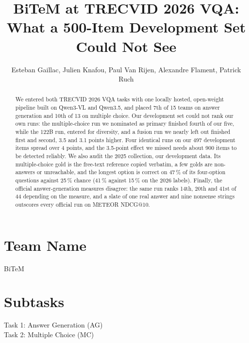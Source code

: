 \documentclass[sigconf,nonacm]{acmart}
\begin{document}
\title{BiTeM at TRECVID 2026 VQA: What a 500-Item Development Set Could Not See}

\author{Esteban Gaillac, Julien Knafou, Paul Van Rijen, Alexandre Flament, Patrick Ruch}

\renewcommand{\shortauthors}{Gaillac et al.}

\begin{abstract}
We entered both TRECVID 2026 VQA tasks with one locally hosted, open-weight
pipeline built on Qwen3-VL and Qwen3.5, and placed 7th of 15 teams on answer
generation and 10th of 13 on multiple choice. Our development set could not rank
our own runs: the multiple-choice run we nominated as primary finished fourth of
our five, while the 122B run, entered for diversity, and a fusion run we nearly left out
finished first and second, 3.5 and 3.1 points higher. Four identical runs on our 497 development items spread over 4
points, and the 3.5-point effect we missed needs about 900 items to be detected
reliably. We also audit the 2025 collection, our development data. Its multiple-choice gold
is the free-text reference copied verbatim, a few golds are non-answers or
unreachable, and the longest option is correct on 47\,\% of its four-option
questions against 25\,\% chance (41\,\% against 15\,\% on the 2026 labels). Finally, the official answer-generation measures disagree: the same run
ranks 14th, 20th and 41st of 44 depending on the measure, and a slate of one real
answer and nine nonsense strings outscores every official run on METEOR NDCG@10.
\end{abstract}


\maketitle
\pagestyle{empty}   %
\thispagestyle{empty}

\section*{Team Name}
BiTeM

\section*{Subtasks}
Task 1: Answer Generation (AG) \\
Task 2: Multiple Choice (MC)
\end{document}
